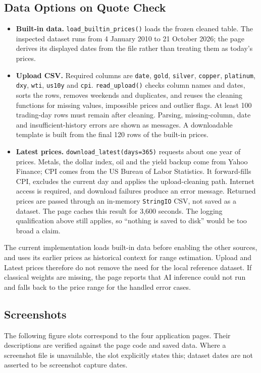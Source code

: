 \subsection{Data Options on Quote Check}
\begin{itemize}
    \item \textbf{Built-in data.} \texttt{load\_builtin\_prices()} loads the
    frozen cleaned table. The inspected dataset runs from 4 January 2010 to
    21 October 2026; the page derives its displayed dates from the file rather
    than treating them as today's prices.
    \item \textbf{Upload CSV.} Required columns are \texttt{date},
    \texttt{gold}, \texttt{silver}, \texttt{copper}, \texttt{platinum},
    \texttt{dxy}, \texttt{wti}, \texttt{us10y} and \texttt{cpi}.
    \texttt{read\_upload()} checks column names and dates, sorts the rows,
    removes weekends and duplicates, and reuses the cleaning functions for
    missing values, impossible prices and outlier flags. At least 100
    trading-day rows must remain after cleaning. Parsing, missing-column,
    date and insufficient-history errors are shown as messages. A downloadable
    template is built from the final 120 rows of the built-in prices.
    \item \textbf{Latest prices.} \texttt{download\_latest(days=365)} requests
    about one year of prices. Metals, the dollar index, oil and the yield
    backup come from Yahoo Finance; CPI comes from the US Bureau of Labor
    Statistics. It forward-fills CPI, excludes the current day and applies
    the upload-cleaning path. Internet access is required, and download
    failures produce an error message. Returned prices are passed through
    an in-memory \texttt{StringIO} CSV, not saved as a dataset. The page caches
    this result for 3,600 seconds. The logging qualification above still
    applies, so ``nothing is saved to disk'' would be too broad a claim.
\end{itemize}

The current implementation loads built-in data before enabling the other
sources, and uses its earlier prices as historical context for range
estimation. Upload and Latest prices therefore do not remove the need for
the local reference dataset. If classical weights are missing, the page
reports that AI inference could not run and falls back to the price range
for the handled error cases.

\subsection{Screenshots}
The following figure slots correspond to the four application pages.
Their descriptions are verified against the page code and saved data.
Where a screenshot file is unavailable, the slot explicitly states this;
dataset dates are not asserted to be screenshot capture dates.

